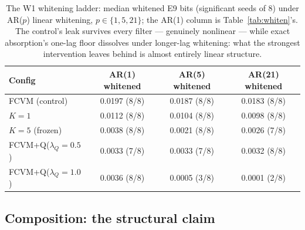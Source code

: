 \documentclass[11pt]{article}
\newcommand{\cfg}[1]{\mbox{#1}}
\begin{document}
\begin{table}[t]
\centering\small
\begin{tabular}{lccc}
\toprule
Config & AR(1) whitened & AR(5) whitened & AR(21) whitened \\
\midrule
\cfg{FCVM} (control)            & 0.0197 (8/8) & 0.0187 (8/8) & 0.0183 (8/8) \\
$K{=}1$                         & 0.0112 (8/8) & 0.0104 (8/8) & 0.0098 (8/8) \\
$K{=}5$ (frozen)                & 0.0038 (8/8) & 0.0021 (8/8) & 0.0026 (7/8) \\
\cfg{FCVM+Q}($\lambda_Q{=}0.5$) & 0.0033 (7/8) & 0.0033 (7/8) & 0.0032 (8/8) \\
\cfg{FCVM+Q}($\lambda_Q{=}1.0$) & 0.0036 (8/8) & 0.0005 (3/8) & 0.0001 (2/8) \\
\bottomrule
\end{tabular}
\caption{The W1 whitening ladder: median whitened E9 bits (significant
seeds of 8) under AR($p$) linear whitening, $p \in \{1, 5, 21\}$; the
AR(1) column is Table~\ref{tab:whiten}'s. The control's leak survives
every filter --- genuinely nonlinear --- while exact absorption's
one-lag floor dissolves under longer-lag whitening: what the strongest
intervention leaves behind is almost entirely linear structure.}
\label{tab:arp}
\end{table}

\subsection{Composition: the structural claim}
\label{sec:structural}
\end{document}
